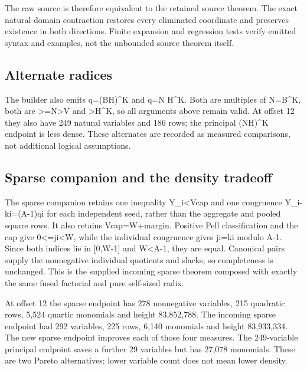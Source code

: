 The raw source is therefore equivalent to the retained source theorem. The exact natural-domain contraction restores every eliminated coordinate and preserves existence in both directions. Finite expansion and regression tests verify emitted syntax and examples, not the unbounded source theorem itself.



\subsection{Alternate radices}



The builder also emits q=\allowbreak{}(BH)\textasciicircum{}\allowbreak{}K and q=\allowbreak{}N H\textasciicircum{}\allowbreak{}K. Both are multiples of N=\allowbreak{}B\textasciicircum{}\allowbreak{}K, both are \textgreater{}\allowbreak{}=\allowbreak{}N\textgreater{}\allowbreak{}V and \textgreater{}\allowbreak{}H\textasciicircum{}\allowbreak{}K, so all arguments above remain valid. At offset 12 they also have 249 natural variables and 186 rows; the principal (NH)\textasciicircum{}\allowbreak{}K endpoint is less dense. These alternates are recorded as measured comparisons, not additional logical assumptions.



\subsection{Sparse companion and the density tradeoff}



The sparse companion retains one inequality Y\_\allowbreak{}i\textless{}\allowbreak{}Vcap and one congruence Y\_\allowbreak{}i-ki=\allowbreak{}(A-1)qi for each independent seed, rather than the aggregate and pooled square rows. It also retains Vcap=\allowbreak{}W+\allowbreak{}margin. Positive Pell classification and the cap give 0\textless{}\allowbreak{}=\allowbreak{}ji\textless{}\allowbreak{}W, while the individual congruence gives ji=\allowbreak{}ki modulo A-1. Since both indices lie in [0,W-1] and W\textless{}\allowbreak{}A-1, they are equal. Canonical pairs supply the nonnegative individual quotients and slacks, so completeness is unchanged. This is the supplied incoming sparse theorem composed with exactly the same fused factorial and pure self-sized radix.



At offset 12 the sparse endpoint has 278 nonnegative variables, 215 quadratic rows, 5,524 quartic monomials and height 83,852,788. The incoming sparse endpoint had 292 variables, 225 rows, 6,140 monomials and height 83,933,334. The new sparse endpoint improves each of those four measures. The 249-variable principal endpoint saves a further 29 variables but has 27,078 monomials. These are two Pareto alternatives; lower variable count does not mean lower density.
